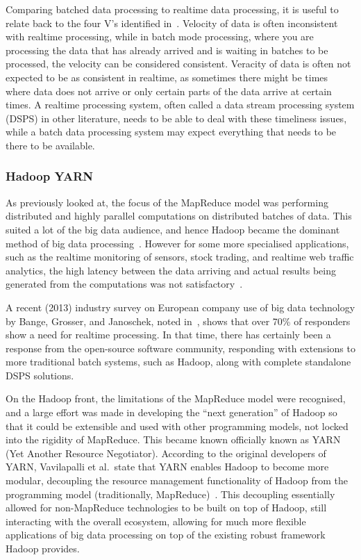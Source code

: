 \documentclass[a4paper,11pt]{article}
\begin{document}
Comparing batched data processing to realtime data processing, it is useful to relate back to the four V's
identified in~. Velocity of data is often inconsistent with realtime processing, while in batch mode
processing, where you are processing the data that has already arrived and is waiting in batches to be processed, the
velocity can be considered consistent. Veracity of data is often not expected to be as consistent in realtime, as
sometimes there might be times where data does not arrive or only certain parts of the data arrive at certain times.
A realtime processing system, often called a data stream processing system (DSPS) in other literature, needs to be able
to deal with these timeliness issues, while a batch data processing system may expect everything that needs to be there
to be available.

\subsubsection{Hadoop YARN} %
\label{ssub:apache_hadoop_yarn_}

As previously looked at, the focus of the MapReduce model was performing distributed and highly parallel computations
on distributed batches of data. This suited a lot of the big data audience, and hence Hadoop became the dominant
method of big data processing~\cite{liu_survey_2014}. However for some more specialised applications, such as
the realtime monitoring of sensors, stock trading, and realtime web traffic analytics, the high latency between the data
arriving and actual results being generated from the computations was not satisfactory~\cite{kamburugamuve_survey_2014}.

A recent (2013) industry survey on European company use of big data technology by Bange, Grosser, and Janoschek, noted
in~\cite{industry_bd_survey}, shows that over 70\% of responders show a need for realtime processing. In that time,
there has certainly been a response from the open-source software community, responding with extensions to more
traditional batch systems, such as Hadoop, along with complete standalone DSPS solutions.

On the Hadoop front, the limitations of the MapReduce model were recognised, and a large effort was made in developing
the ``next generation'' of Hadoop so that it could be extensible and used with other programming models, not locked into
the rigidity of MapReduce. This became known officially known as YARN (Yet Another Resource Negotiator). According to
the original developers of YARN, Vavilapalli et al.\ state that YARN enables Hadoop to become more modular, decoupling
the resource management functionality of Hadoop from the programming model (traditionally, MapReduce)~\cite{vavilapalli2013apache}.
This decoupling essentially allowed for non-MapReduce technologies to be built on top of Hadoop, still interacting with the
overall ecosystem, allowing for much more flexible applications of big data processing on top of the existing robust
framework Hadoop provides.
\end{document}

